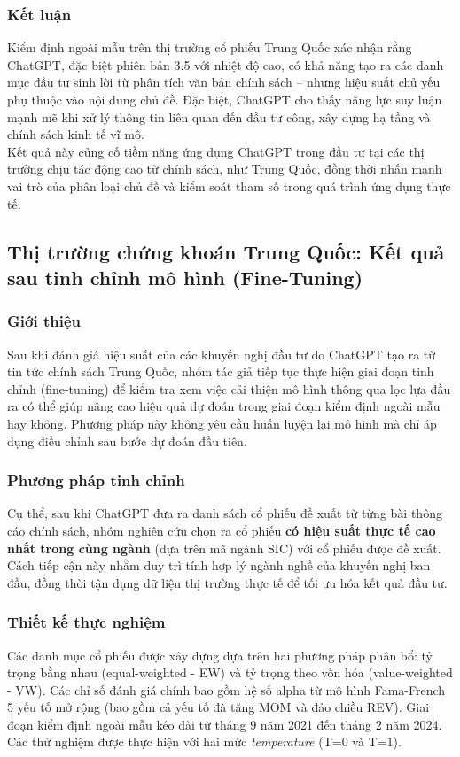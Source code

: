 \documentclass[a4paper,12pt]{article}
\begin{document}
\subsubsection{Kết luận}
Kiểm định ngoài mẫu trên thị trường cổ phiếu Trung Quốc xác nhận rằng ChatGPT, đặc biệt phiên bản 3.5 với nhiệt độ cao, có khả năng tạo ra các danh mục đầu tư sinh lời từ phân tích văn bản chính sách – nhưng hiệu suất chủ yếu phụ thuộc vào nội dung chủ đề. Đặc biệt, ChatGPT cho thấy năng lực suy luận mạnh mẽ khi xử lý thông tin liên quan đến đầu tư công, xây dựng hạ tầng và chính sách kinh tế vĩ mô.
\noindent
\\Kết quả này củng cố tiềm năng ứng dụng ChatGPT trong đầu tư tại các thị trường chịu tác động cao từ chính sách, như Trung Quốc, đồng thời nhấn mạnh vai trò của phân loại chủ đề và kiểm soát tham số trong quá trình ứng dụng thực tế.
\subsection{Thị trường chứng khoán Trung Quốc: Kết quả sau tinh chỉnh mô hình (Fine-Tuning)}

\subsubsection{Giới thiệu}
Sau khi đánh giá hiệu suất của các khuyến nghị đầu tư do ChatGPT tạo ra từ tin tức chính sách Trung Quốc, nhóm tác giả tiếp tục thực hiện giai đoạn tinh chỉnh (fine-tuning) để kiểm tra xem việc cải thiện mô hình thông qua lọc lựa đầu ra có thể giúp nâng cao hiệu quả dự đoán trong giai đoạn kiểm định ngoài mẫu hay không. Phương pháp này không yêu cầu huấn luyện lại mô hình mà chỉ áp dụng điều chỉnh sau bước dự đoán đầu tiên.

\subsubsection{Phương pháp tinh chỉnh}
Cụ thể, sau khi ChatGPT đưa ra danh sách cổ phiếu đề xuất từ từng bài thông cáo chính sách, nhóm nghiên cứu chọn ra cổ phiếu \textbf{có hiệu suất thực tế cao nhất trong cùng ngành} (dựa trên mã ngành SIC) với cổ phiếu được đề xuất. Cách tiếp cận này nhằm duy trì tính hợp lý ngành nghề của khuyến nghị ban đầu, đồng thời tận dụng dữ liệu thị trường thực tế để tối ưu hóa kết quả đầu tư.

\subsubsection{Thiết kế thực nghiệm}
Các danh mục cổ phiếu được xây dựng dựa trên hai phương pháp phân bổ: tỷ trọng bằng nhau (equal-weighted - EW) và tỷ trọng theo vốn hóa (value-weighted - VW). Các chỉ số đánh giá chính bao gồm hệ số alpha từ mô hình Fama-French 5 yếu tố mở rộng (bao gồm cả yếu tố đà tăng MOM và đảo chiều REV). Giai đoạn kiểm định ngoài mẫu kéo dài từ tháng 9 năm 2021 đến tháng 2 năm 2024. Các thử nghiệm được thực hiện với hai mức \textit{temperature} (T=0 và T=1).
\end{document}
